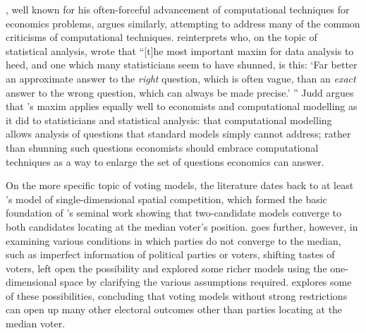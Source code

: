 \documentclass[12pt]{article}
\numberwithin{equation}{subsection}
\begin{document}
\citet{hce:Judd}, well known for his often-forceful advancement of computational techniques for
economics problems, argues similarly, attempting to address many of the common criticisms of
computational techniques.  \citeauthor{hce:Judd} reinterprets \citet{Tukey62} who, on the topic of
statistical analysis, wrote that ``[t]he most important maxim for data analysis to heed, and one
which many statisticians seem to have shunned, is this: `Far better an approximate answer to the
\emph{right} question, which is often vague, than an \emph{exact} answer to the wrong question,
which can always be made precise.' ''  Judd argues that \citeauthor{Tukey62}'s maxim applies equally
well to economists and computational modelling as it did to statisticians and statistical analysis:
that computational modelling allows analysis of questions that standard models simply cannot
address; rather than shunning such questions economists should embrace computational techniques as a
way to enlarge the set of questions economics can answer.

On the more specific topic of voting models, the literature dates back to at least \citet{Hotelling29}'s
model of single-dimensional spatial competition, which formed the basic foundation of
\citet{Downs57}'s seminal work showing that two-candidate models converge to both candidates
locating at the median voter's position.  \citeauthor{Downs57} goes further, however, in examining
various conditions in which parties do not converge to the median, such as imperfect information of
political parties or voters, shifting tastes of voters, left open the possibility and explored some
richer models using the one-dimensional space by clarifying the various assumptions required.
\citet{Downs57} explores some of these possibilities, concluding that voting models without
strong restrictions can open up many other electoral outcomes other than parties locating at the
median voter.
\end{document}
